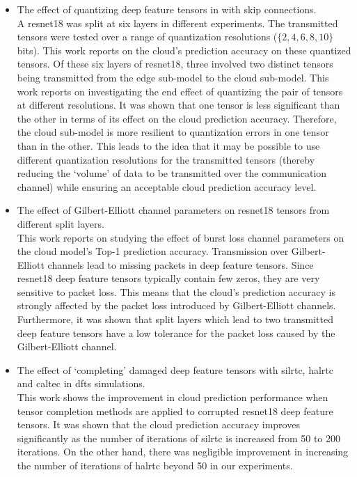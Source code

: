 \begin{itemize}
	\item The effect of quantizing deep feature tensors in  with skip connections.\\
	A \gls{resnet18} was split at six layers in different experiments. The transmitted tensors were tested over a range of quantization resolutions ($\{2,4,6,8,10\}$ bits). This work reports on the cloud's prediction accuracy on these quantized tensors. Of these six layers of \gls{resnet18}, three involved two distinct tensors being transmitted from the edge sub-model to the cloud sub-model. This work reports on investigating the end effect of quantizing the pair of tensors at different resolutions. It was shown that one tensor is less significant than the other in terms of its effect on the cloud prediction accuracy. Therefore, the cloud sub-model is more resilient to quantization errors in one tensor than in the other. This leads to the idea that it may be possible to use different quantization resolutions for the transmitted tensors (thereby reducing the `volume' of data to be transmitted over the communication channel) while ensuring an acceptable cloud prediction accuracy level.
	\item The effect of Gilbert-Elliott channel parameters on \gls{resnet18} tensors from different split layers. \\
	This work reports on studying the effect of burst loss channel parameters on the cloud model's Top-1 prediction accuracy. Transmission over Gilbert-Elliott channels lead to missing packets in deep feature tensors. Since \gls{resnet18} deep feature tensors typically contain few zeros, they are very sensitive to packet loss. This means that the cloud's prediction accuracy is strongly affected by the packet loss introduced by Gilbert-Elliott channels. Furthermore, it was shown that split layers which lead to two transmitted deep feature tensors have a low tolerance for the packet loss caused by the Gilbert-Elliott channel.
	\item The effect of `completing' damaged deep feature tensors with \gls{silrtc}, \gls{halrtc} and \gls{caltec} in \gls{dfts} simulations. \\
	This work shows the improvement in cloud prediction performance when tensor completion methods are applied to corrupted \gls{resnet18} deep feature tensors. It was shown that the cloud prediction accuracy improves significantly as the number of iterations of \gls{silrtc} is increased from 50 to 200 iterations. On the other hand, there was negligible improvement in increasing the number of iterations of \gls{halrtc} beyond 50 in our experiments.

\end{itemize}
